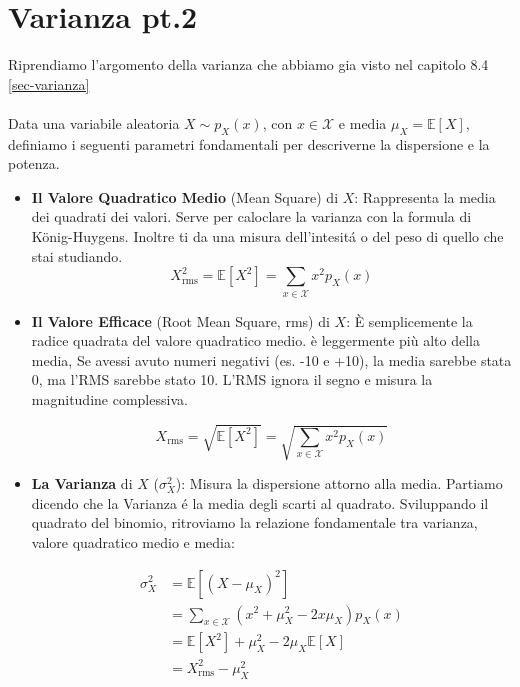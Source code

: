 \section{Varianza pt.2}
Riprendiamo l'argomento della varianza che abbiamo gia visto nel capitolo 8.4 \ref{sec-varianza}
\\\\Data una variabile aleatoria $X \sim p_X(x)$, con $x \in \mathcal{X}$ e media $\mu_X = \mathbb{E}[X]$, definiamo i seguenti parametri fondamentali per descriverne la dispersione e la potenza.

\begin{itemize}
    \item \textbf{Il Valore Quadratico Medio} (Mean Square) di $X$:
    Rappresenta la media dei quadrati dei valori. Serve per caloclare la varianza con la formula di König-Huygens. Inoltre ti da una misura dell'intesitá o del peso di quello che stai studiando.
    \begin{equation}
    \boxed{X^2_{\text{rms}} = \mathbb{E}[X^2] = \sum_{x \in \mathcal{X}} x^2 p_X(x)}
    \end{equation}

    \item \textbf{Il Valore Efficace} (Root Mean Square, rms) di $X$:
    È semplicemente la radice quadrata del valore quadratico medio. è leggermente più alto della media, Se avessi avuto numeri negativi (es. -10 e +10), la media sarebbe stata 0, ma l'RMS sarebbe stato 10. L'RMS ignora il segno e misura la magnitudine complessiva.
    
    \begin{equation}
    X_{\text{rms}} = \sqrt{\mathbb{E}[X^2]} = \sqrt{\sum_{x \in \mathcal{X}} x^2 p_X(x)}
    \end{equation}

    \item \textbf{La Varianza} di $X$ ($\sigma_X^2$):
    Misura la dispersione attorno alla media. Partiamo dicendo che la Varianza é la media degli scarti al quadrato. Sviluppando il quadrato del binomio, ritroviamo la relazione fondamentale tra varianza, valore quadratico medio e media:

    \begin{equation}
    \begin{aligned}
    \sigma_X^2 &= \mathbb{E}\left[ (X - \mu_X)^2 \right] \\
    &= \sum_{x \in \mathcal{X}} (x^2 + \mu_X^2 - 2x\mu_X) p_X(x) \\
    &= \mathbb{E}[X^2] + \mu_X^2 - 2\mu_X\mathbb{E}[X] \\
    &= X^2_{\text{rms}} - \mu_X^2
    \end{aligned}
    \end{equation}
    

\end{itemize}

